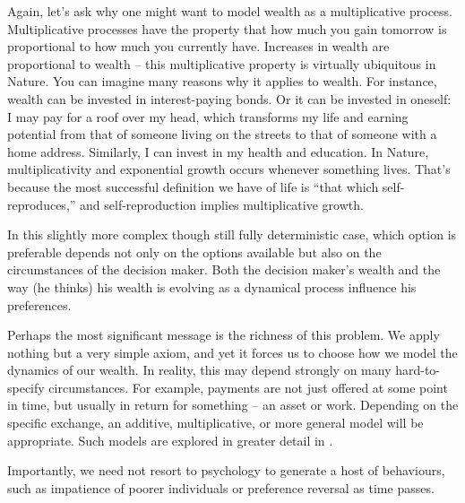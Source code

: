 Again, let's ask why one might want to model wealth as a multiplicative process. Multiplicative processes have the property that how much you gain tomorrow is proportional to how much you currently have. Increases in wealth are proportional to wealth -- this multiplicative property is virtually ubiquitous in Nature. You can imagine many reasons why it applies to wealth. For instance, wealth can be invested in interest-paying bonds. Or it can be invested in oneself: I may pay for a roof over my head, which transforms my life and earning potential from that of someone living on the streets to that of someone with a home address. Similarly, I can invest in my health and education. 
In Nature, multiplicativity and exponential growth occurs whenever something lives. That's because the most successful definition we have of life is ``that which self-reproduces,'' and self-reproduction implies multiplicative growth.

In this slightly more complex though still fully deterministic case, which option is preferable depends not only on the options available but also on the circumstances of the decision maker. Both the decision maker's wealth and the way (he thinks) his wealth is evolving as a dynamical process influence his preferences.

Perhaps the most significant message is the richness of this problem. We apply nothing but a very simple axiom, and yet it forces us to choose how we model the dynamics of our wealth. In reality, this may depend strongly on many hard-to-specify circumstances. For example, payments are not just offered at some point in time, but usually in return for something -- an asset or work. Depending on the specific exchange, an additive, multiplicative, or more general model will be appropriate. Such models are explored in greater detail in \cite{AdamouETAL2019}. 

Importantly, we need not resort to psychology to generate a host of behaviours, such as impatience of poorer individuals or preference reversal as time passes.